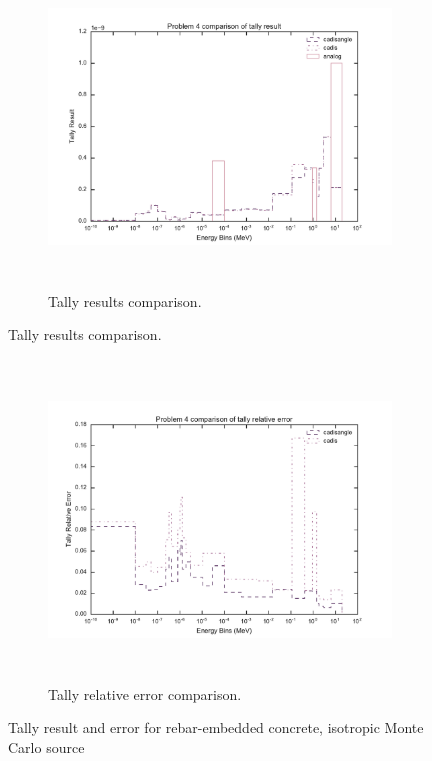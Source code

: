 \begin{figure}[htb!]
  \centering
  \begin{subfigure}[t]{\textwidth}
    \centering
  \includegraphics[height=8.5cm]{./chapters/characterization_probs/figures/char/prob_4_iso/problem_4_tally_result_compare.pdf}
  \caption[Tally results comparison.]
  {Tally results comparison.}
  \label{fig:isorebarresult}
  \end{subfigure}
\end{figure}
\begin{figure}[htb!]\ContinuedFloat
  \centering
  \begin{subfigure}[t]{\textwidth}
  \centering
  \includegraphics[height=8.5cm]{./chapters/characterization_probs/figures/char/prob_4_iso/problem_4_tally_error_compare.pdf}
  \caption[Tally relative error comparison.]
  {Tally relative error comparison.}
  \label{fig:isorebarerror}
  \end{subfigure}
\caption[Tally result and error for rebar-embedded concrete, isotropic Monte
  Carlo source]{Tally result and error for rebar-embedded concrete, isotropic
    Monte Carlo source}
\label{fig:isorebarresults}
\end{figure}


